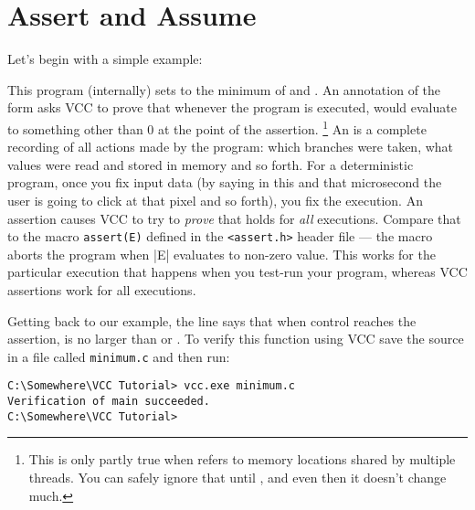 \section{Assert and Assume}
\label{sect:assert-assume}


Let's begin with a simple example:

This program (internally) sets  to the minimum of  and
. 
An annotation of the form  asks VCC to prove that whenever
the program is executed,  would evaluate to something other than 0 at the point of the assertion.%
\footnote{This is only partly true when  refers to memory locations shared by multiple
threads.
You can safely ignore that until , and even then it doesn't change much.
}
An  is a complete recording of all actions made by the program:
which branches were taken, what values were read and stored in memory
and so forth.
For a deterministic program, once you fix input data (\eg by saying in this and that
microsecond the user is going to click at that pixel and so forth),
you fix the execution.
An assertion causes VCC to try to \emph{prove} that  holds for \emph{all}
executions.
Compare that to the macro \lstinline|assert(E)| defined in the \lstinline|<assert.h>|
header file --- the macro aborts the program when \vcc|E| evaluates to non-zero value.
This works for the particular execution that happens when you test-run your program,
whereas VCC assertions work for all executions.

Getting back to our example,
the line  says
that when control reaches the assertion,  is no larger than  or
. 
To verify this function using VCC save the source in a file called \lstinline|minimum.c|
and then run:

\begin{lstlisting}
C:\Somewhere\VCC Tutorial> vcc.exe minimum.c
Verification of main succeeded.
C:\Somewhere\VCC Tutorial>
\end{lstlisting}

